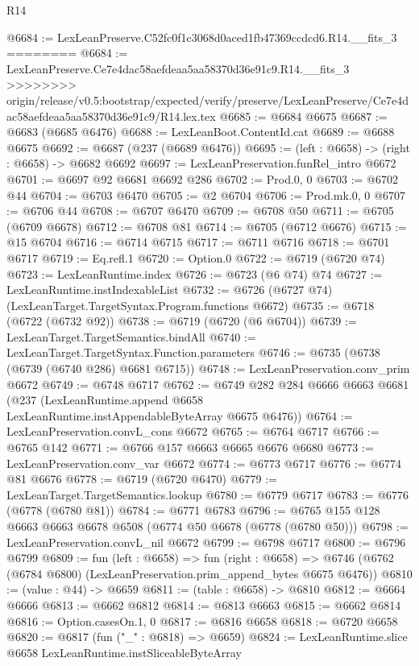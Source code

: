 \begin{lexlean}{R14}
\begin{coremodule}
{{{{{{{{{{{{{{{{{{{{{{{{{{{{{{{{{{{{{{{{{{{{{{{{{{{{{{{{{{{{{{{{{{{{{{{{{{{{{{{{{{@6684 := LexLeanPreserve.C52fc0f1c3068d0aced1fb47369ccdcd6.R14.__fits_3
========
@6684 := LexLeanPreserve.Ce7e4dac58aefdeaa5aa58370d36e91c9.R14.__fits_3
>>>>>>>> origin/release/v0.5:bootstrap/expected/verify/preserve/LexLeanPreserve/Ce7e4dac58aefdeaa5aa58370d36e91c9/R14.lex.tex
@6685 := @6684 @6675
@6687 := @6683 (@6685 @6476)
@6688 := LexLeanBoot.ContentId.cat
@6689 := @6688 @6675
@6692 := @6687 (@237 (@6689 @6476))
@6695 := (left : @6658) -> (right : @6658) -> @6682 @6692
@6697 := LexLeanPreservation.funRel_intro @6672
@6701 := @6697 @92 @6681 @6692 @286
@6702 := Prod.{0, 0}
@6703 := @6702 @44
@6704 := @6703 @6470
@6705 := @2 @6704
@6706 := Prod.mk.{0, 0}
@6707 := @6706 @44
@6708 := @6707 @6470
@6709 := @6708 @50
@6711 := @6705 (@6709 @6678)
@6712 := @6708 @81
@6714 := @6705 (@6712 @6676)
@6715 := @15 @6704
@6716 := @6714 @6715
@6717 := @6711 @6716
@6718 := @6701 @6717
@6719 := Eq.refl.{1}
@6720 := Option.{0}
@6722 := @6719 (@6720 @74)
@6723 := LexLeanRuntime.index
@6726 := @6723 (@6 @74) @74
@6727 := LexLeanRuntime.instIndexableList
@6732 := @6726 (@6727 @74) (LexLeanTarget.TargetSyntax.Program.functions @6672)
@6735 := @6718 (@6722 (@6732 @92))
@6738 := @6719 (@6720 (@6 @6704))
@6739 := LexLeanTarget.TargetSemantics.bindAll
@6740 := LexLeanTarget.TargetSyntax.Function.parameters
@6746 := @6735 (@6738 (@6739 (@6740 @286) @6681 @6715))
@6748 := LexLeanPreservation.conv_prim @6672
@6749 := @6748 @6717
@6762 := @6749
    @282
    @284
    @6666
    @6663
    @6681
    (@237 (LexLeanRuntime.append @6658 LexLeanRuntime.instAppendableByteArray @6675 @6476))
@6764 := LexLeanPreservation.convL_cons @6672
@6765 := @6764 @6717
@6766 := @6765 @142
@6771 := @6766 @157 @6663 @6665 @6676 @6680
@6773 := LexLeanPreservation.conv_var @6672
@6774 := @6773 @6717
@6776 := @6774 @81 @6676
@6778 := @6719 (@6720 @6470)
@6779 := LexLeanTarget.TargetSemantics.lookup
@6780 := @6779 @6717
@6783 := @6776 (@6778 (@6780 @81))
@6784 := @6771 @6783
@6796 := @6765 @155 @128 @6663 @6663 @6678 @6508 (@6774 @50 @6678 (@6778 (@6780 @50)))
@6798 := LexLeanPreservation.convL_nil @6672
@6799 := @6798 @6717
@6800 := @6796 @6799
@6809 := fun (left : @6658) =>
  fun (right : @6658) =>
  @6746 (@6762 (@6784 @6800) (LexLeanPreservation.prim_append_bytes @6675 @6476))
@6810 := (value : @44) -> @6659
@6811 := (table : @6658) -> @6810
@6812 := @6664 @6666
@6813 := @6662 @6812
@6814 := @6813 @6663
@6815 := @6662 @6814
@6816 := Option.casesOn.{1, 0}
@6817 := @6816 @6658
@6818 := @6720 @6658
@6820 := @6817 (fun ("_" : @6818) => @6659)
@6824 := LexLeanRuntime.slice @6658 LexLeanRuntime.instSliceableByteArray
}}}}}}}}}}}}}}}}}}}}}}}}}}}}}}}}}}}}}}}}}}}}}}}}}}}}}}}}}}}}}}}}}}}}}}}}}}}}}}}}}}
\end{coremodule}
\end{lexlean}
